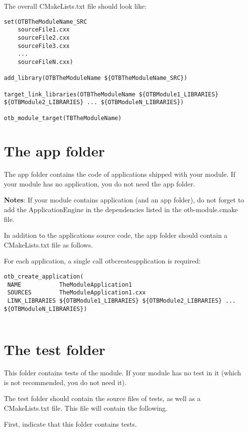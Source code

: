 The overall CMakeLists.txt file should look like: 

\begin{verbatim}
set(OTBTheModuleName_SRC
    sourceFile1.cxx
    sourceFile2.cxx
    sourceFile3.cxx
    ...
    sourceFileN.cxx)

add_library(OTBTheModuleName ${OTBTheModuleName_SRC})

target_link_libraries(OTBTheModuleName ${OTBModule1_LIBRARIES} ${OTBModule2_LIBRARIES} ... ${OTBModuleN_LIBRARIES})

otb_module_target(TBTheModuleName)
\end{verbatim}

\section{The app folder}

The app folder contains the code of applications shipped with your module. If your module has no application, you do not need the app folder.

\textbf{Notes}: If your module contains application (and an app folder), do not forget to add the ApplicationEngine in the dependencies listed in the otb-module.cmake file.

In addition to the applications source code, the app folder should contain a CMakeLists.txt file as follows.

For each application, a single call otb\textunderscore create\textunderscore application is required: 

\begin{verbatim}
otb_create_application(
 NAME           TheModuleApplication1
 SOURCES        TheModuleApplication1.cxx
 LINK_LIBRARIES ${OTBModule1_LIBRARIES} ${OTBModule2_LIBRARIES} ... ${OTBModuleN_LIBRARIES})
 
\end{verbatim}

\section{The test folder}

This folder contains tests of the module. If your module has no test in it (which is not recommended, you do not need it).

The test folder should contain the source files of tests, as well as a CMakeLists.txt file. This file will contain the following.

First, indicate that this folder contains tests. 


